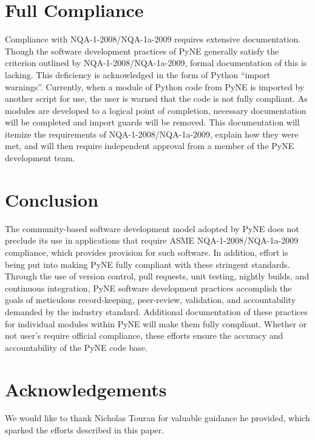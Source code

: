 \documentclass{anstrans}
\begin{document}
\section{Full Compliance}

Compliance with NQA-1-2008/NQA-1a-2009 requires extensive documentation.
Though the software development practices of PyNE generally satisfy the
criterion outlined by NQA-1-2008/NQA-1a-2009, formal documentation of this is
lacking. This deficiency is acknowledged in the form of Python ``import
warnings''. Currently, when a module of Python code from PyNE is imported by
another script for use, the user is warned that the code is not fully
compliant. As modules are developed to a logical point of completion, necessary
documentation will be completed and import guards will be removed. 
This documentation will itemize the requirements of NQA-1-2008/NQA-1a-2009,
explain how they were met, and will then require independent approval from a
member of the PyNE development team.

\section{Conclusion}

The community-based software development model adopted by PyNE does not
preclude its use in applications that require ASME NQA-1-2008/NQA-1a-2009
compliance, which provides provision for such software. In addition, effort is
being put into making PyNE fully compliant with these stringent standards.
Through the use of version control, pull requests, unit testing, nightly builds, and
continuous integration, PyNE software development practices accomplish the
goals of meticulous record-keeping, peer-review, validation, and accountability
demanded by the industry standard. Additional documentation of these practices for
individual modules within PyNE will make them fully compliant. Whether or not
user's require official compliance, these efforts ensure the accuracy and
accountability of the PyNE code base.

\section{Acknowledgements}

We would like to thank Nicholas Touran for valuable guidance he provided, which
sparked the efforts described in this paper.




\end{document}
